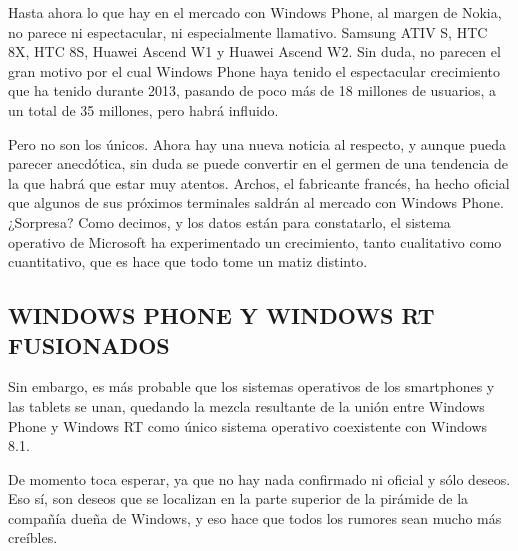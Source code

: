 Hasta ahora lo que hay en el mercado con Windows Phone, al margen de Nokia, no parece ni espectacular, ni especialmente llamativo. Samsung ATIV S, HTC 8X, HTC 8S, Huawei 
Ascend W1 y Huawei Ascend W2. Sin duda, no parecen el gran motivo por el cual Windows Phone haya tenido el espectacular crecimiento que ha tenido durante 2013, pasando de 
poco más de 18 millones de usuarios, a un total de 35 millones, pero habrá influido.

Pero no son los únicos. Ahora hay una nueva noticia al respecto, y aunque pueda parecer anecdótica, sin duda se puede convertir en el germen de una tendencia de la que 
habrá que estar muy atentos. Archos, el fabricante francés, ha hecho oficial que algunos de sus próximos terminales saldrán al mercado con Windows Phone. ¿Sorpresa? Como 
decimos, y los datos están para constatarlo, el sistema operativo de Microsoft ha experimentado un crecimiento, tanto cualitativo como cuantitativo, que es hace que todo 
tome un matiz distinto.

\subsection*{WINDOWS PHONE Y WINDOWS RT FUSIONADOS}
Sin embargo, es más probable que los sistemas operativos de los smartphones y las tablets se unan, quedando la mezcla resultante de la unión entre Windows Phone y Windows 
RT como único sistema operativo coexistente con Windows 8.1.

De momento toca esperar, ya que no hay nada confirmado ni oficial y sólo deseos. Eso sí, son deseos que se localizan en la parte superior de la pirámide de la compañía 
dueña de Windows, y eso hace que todos los rumores sean mucho más creíbles.